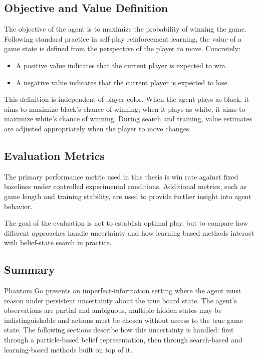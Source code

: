 \documentclass[12pt,oneside,openright]{article}
\begin{document}
\subsection{Objective and Value Definition}

The objective of the agent is to maximize the probability of winning the game. Following standard practice in self-play reinforcement learning, the value of a game state is defined from the perspective of the player to move.
Concretely:
\begin{itemize}
  \item A positive value indicates that the current player is expected to win.
  \item A negative value indicates that the current player is expected to lose.
\end{itemize}

This definition is independent of player color. When the agent plays as black, it aims to maximize black's chance of winning; when it plays as white, it aims to maximize white's chance of winning. During search and training, value estimates are adjusted appropriately when the player to move changes.

\subsection{Evaluation Metrics}

The primary performance metric used in this thesis is win rate against fixed baselines under controlled experimental conditions. Additional metrics, such as game length and training stability, are used to provide further insight into agent behavior.

The goal of the evaluation is not to establish optimal play, but to compare how different approaches handle uncertainty and how learning-based methods interact with belief-state search in practice.

\subsection{Summary}

Phantom Go presents an imperfect-information setting where the agent must reason under persistent uncertainty about the true board state. The agent's observations are partial and ambiguous, multiple hidden states may be indistinguishable and actions must be chosen without access to the true game state. The following sections describe how this uncertainty is handled: first through a particle-based belief representation, then through search-based and learning-based methods built on top of it.
\end{document}
